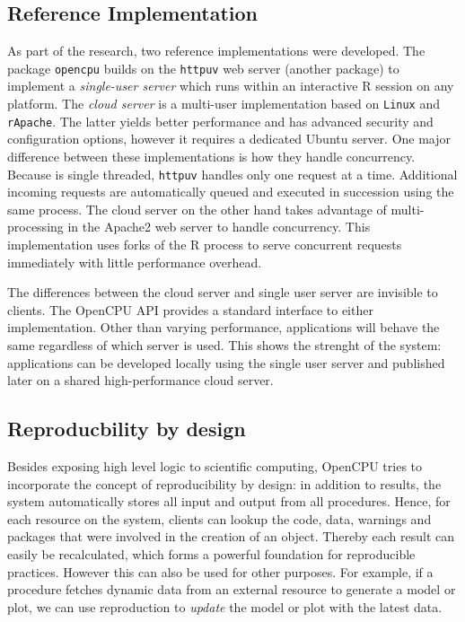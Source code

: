 \subsection{Reference Implementation}

As part of the research, two reference implementations were developed. The \R package \texttt{opencpu} builds on the \texttt{httpuv} web server (another \R package) to implement a \emph{single-user server} which runs within an interactive R session on any platform. The \emph{cloud server} is a multi-user implementation based on \texttt{Linux} and \texttt{rApache}. The latter yields better performance and has advanced security and configuration options, however it requires a dedicated Ubuntu server. One major difference between these implementations is how they handle concurrency. Because \R is single threaded, \texttt{httpuv} handles only one request at a time. Additional incoming requests are automatically queued and executed in succession using the same process. The cloud server on the other hand takes advantage of multi-processing in the Apache2 web server to handle concurrency. This implementation uses forks of the R process to serve concurrent requests immediately with little performance overhead. 

The differences between the cloud server and single user server are invisible to clients. The OpenCPU API provides a standard interface to either implementation. Other than varying performance, applications will behave the same regardless of which server is used. This shows the strenght of the system: applications can be developed locally using the single user server and published later on a shared high-performance cloud server.

\subsection{Reproducbility by design}

Besides exposing high level logic to scientific computing, OpenCPU tries to incorporate the concept of reproducibility by design: in addition to results, the system automatically stores all input and output from all procedures. Hence, for each resource on the system, clients can lookup the code, data, warnings and packages that were involved in the creation of an object. Thereby each result can easily be recalculated, which forms a powerful foundation for reproducible practices. However this can also be used for other purposes. For example, if a procedure fetches dynamic data from an external resource to generate a model or plot, we can use reproduction to \emph{update} the model or plot with the latest data.

